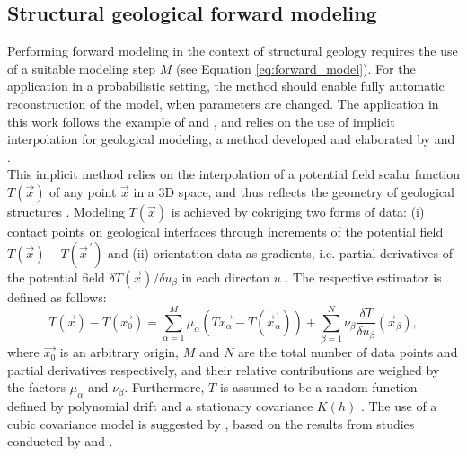         \subsection{Structural geological forward modeling}\label{sec:struc_geo_modeling}       
        Performing forward modeling in the context of structural geology requires the use of a suitable modeling step $M$ (see Equation \ref{eq:forward_model}). For the application in a probabilistic setting, the method should enable fully automatic reconstruction of the model, when parameters are changed. The application in this work follows the example of \citet{wellmann2010towards} and \citet{delaVarga2016}, and relies on the use of implicit interpolation for geological modeling, a method developed and elaborated by \citet{lajaunie1997foliation} and \citet{calcagno2008geological}.\\
        This implicit method relies on the interpolation of a potential field scalar function $T(\vec{x})$ of any point $\vec{x}$ in a 3D space, and thus reflects the geometry of geological structures \citep{calcagno2008geological}. Modeling $T(\vec{x})$ is achieved by cokriging two forms of data: (i) contact points on geological interfaces through increments of the potential field $T(\vec{x})-T(\vec{x}^{\,'})$ and (ii) orientation data as gradients, i.e. partial derivatives of the potential field $\delta T(\vec{x})/\delta u_\beta$ in each directon $u$ \citep{calcagno2008geological}. The respective estimator is defined as follows:
        \begin{equation}\label{eq:Cokriging_Estimator}
                T(\vec{x})-T(\vec{x_0})=\sum_{\alpha=1}^{M}\mu_\alpha(T\vec{x_\alpha}-T(\vec{x}^{\,'}_\alpha))+\sum_{\beta=1}^{N}\nu_\beta\frac{\delta T}{\delta u_\beta}(\vec{x}_\beta),
        \end{equation}        
        where $\vec{x_0}$ is an arbitrary origin, $M$ and $N$ are the total number of data points and partial derivatives respectively, and their relative contributions are weighed by the factors $\mu_\alpha$ and $\nu_\beta$. Furthermore, $T$ is assumed to be a random function defined by polynomial drift and a stationary covariance $K(h)$ \citep{calcagno2008geological}. The use of a cubic covariance model is suggested by \citet{calcagno2008geological}, based on the results from studies conducted by \citet{aug2004modelisation} and \citet{chiles2004modelling}.
